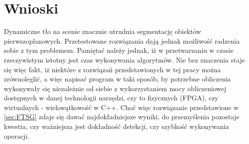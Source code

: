 \chapter{Wnioski}
\label{sec:wnioski}
Dynamiczne tło na scenie znacznie utrudnia segmentację obiektów pierwszoplanowych. Przetestowane rozwiązania dają jednak możliwość radzenia sobie z tym problemem. Pamiętać należy jednak, iż w przetwarzaniu w czasie rzeczywistym istotny jest czas wykonywania algorytmów. Nie bez znaczenia staje się więc fakt, iż niektóre z rozwiązań przedstawionych w tej pracy można zrównoleglić, a więc napisać program w taki sposób, by potrzebne obliczenia wykonywały się niezależnie od siebie z wykorzystaniem mocy obliczeniowej dostępnych w danej technologii narzędzi, czy to fizycznych (FPGA), czy wirtualnych - wielowątkowość w C++. Choć więc rozwiązanie przedstawione w \ref{sec:FTSG} zdaje się dawać najdokładniejsze wyniki, do przemyślenia pozostaje kwestia, czy ważniejsza jest dokładność detekcji, czy szybkość wykonywania operacji.